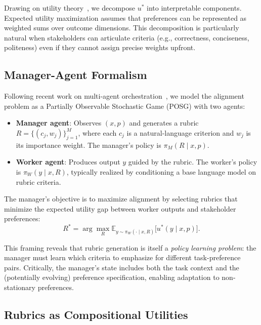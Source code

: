 \documentclass[sigconf]{acmart}
\begin{document}
Drawing on utility theory~\cite{savage1954}, we decompose \(u^*\) into interpretable components. Expected utility maximization assumes that preferences can be represented as weighted sums over outcome dimensions. This decomposition is particularly natural when stakeholders can articulate criteria (e.g., correctness, conciseness, politeness) even if they cannot assign precise weights upfront.


\subsection{Manager-Agent Formalism}

Following recent work on multi-agent orchestration~\cite{magym2025}, we model the alignment problem as a Partially Observable Stochastic Game (POSG) with two agents:

\begin{itemize}
\item \textbf{Manager agent}: Observes \((x, p)\) and generates a rubric \(R = \{(c_j, w_j)\}_{j=1}^M\), where each \(c_j\) is a natural-language criterion and \(w_j\) is its importance weight. The manager's policy is \(\pi_M(R \mid x, p)\).

\item \textbf{Worker agent}: Produces output \(y\) guided by the rubric. The worker's policy is \(\pi_W(y \mid x, R)\), typically realized by conditioning a base language model on rubric criteria.
\end{itemize}

The manager's objective is to maximize alignment by selecting rubrics that minimize the expected utility gap between worker outputs and stakeholder preferences:
\begin{equation}
R^* = \arg\max_R \mathbb{E}_{y \sim \pi_W(\cdot \mid x, R)}\big[u^*(y \mid x, p)\big].
\label{eq:manager-objective}
\end{equation}

This framing reveals that rubric generation is itself a \emph{policy learning problem}: the manager must learn which criteria to emphasize for different task-preference pairs. Critically, the manager's state includes both the task context and the (potentially evolving) preference specification, enabling adaptation to non-stationary preferences.


\subsection{Rubrics as Compositional Utilities}
\end{document}

